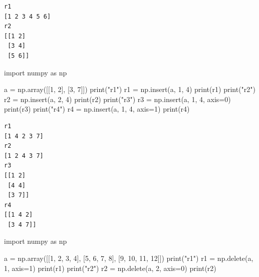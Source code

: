 \documentclass[
  english,
  letterpaper,
  DIV=11,
  numbers=noendperiod]{scrreprt}
\newenvironment{Shaded}{\begin{snugshade}}{\end{snugshade}}
\newcommand{\BuiltInTok}[1]{\textcolor[rgb]{0.00,0.23,0.31}{#1}}
\newcommand{\DecValTok}[1]{\textcolor[rgb]{0.68,0.00,0.00}{#1}}
\newcommand{\ImportTok}[1]{\textcolor[rgb]{0.00,0.46,0.62}{#1}}
\newcommand{\NormalTok}[1]{\textcolor[rgb]{0.00,0.23,0.31}{#1}}
\newcommand{\OperatorTok}[1]{\textcolor[rgb]{0.37,0.37,0.37}{#1}}
\newcommand{\StringTok}[1]{\textcolor[rgb]{0.13,0.47,0.30}{#1}}
\begin{document}
\begin{verbatim}
r1
[1 2 3 4 5 6]
r2
[[1 2]
 [3 4]
 [5 6]]
\end{verbatim}

\begin{Shaded}
\begin{Highlighting}[]
\ImportTok{import}\NormalTok{ numpy }\ImportTok{as}\NormalTok{ np}

\NormalTok{a }\OperatorTok{=}\NormalTok{ np.array([[}\DecValTok{1}\NormalTok{, }\DecValTok{2}\NormalTok{], [}\DecValTok{3}\NormalTok{, }\DecValTok{7}\NormalTok{]])}
\BuiltInTok{print}\NormalTok{(}\StringTok{"r1"}\NormalTok{)}
\NormalTok{r1 }\OperatorTok{=}\NormalTok{ np.insert(a, }\DecValTok{1}\NormalTok{, }\DecValTok{4}\NormalTok{)}
\BuiltInTok{print}\NormalTok{(r1)}
\BuiltInTok{print}\NormalTok{(}\StringTok{"r2"}\NormalTok{)}
\NormalTok{r2 }\OperatorTok{=}\NormalTok{ np.insert(a, }\DecValTok{2}\NormalTok{, }\DecValTok{4}\NormalTok{)}
\BuiltInTok{print}\NormalTok{(r2)}
\BuiltInTok{print}\NormalTok{(}\StringTok{"r3"}\NormalTok{)}
\NormalTok{r3 }\OperatorTok{=}\NormalTok{ np.insert(a, }\DecValTok{1}\NormalTok{, }\DecValTok{4}\NormalTok{, axis}\OperatorTok{=}\DecValTok{0}\NormalTok{)}
\BuiltInTok{print}\NormalTok{(r3)}
\BuiltInTok{print}\NormalTok{(}\StringTok{"r4"}\NormalTok{)}
\NormalTok{r4 }\OperatorTok{=}\NormalTok{ np.insert(a, }\DecValTok{1}\NormalTok{, }\DecValTok{4}\NormalTok{, axis}\OperatorTok{=}\DecValTok{1}\NormalTok{)}
\BuiltInTok{print}\NormalTok{(r4)}
\end{Highlighting}
\end{Shaded}

\begin{verbatim}
r1
[1 4 2 3 7]
r2
[1 2 4 3 7]
r3
[[1 2]
 [4 4]
 [3 7]]
r4
[[1 4 2]
 [3 4 7]]
\end{verbatim}

\begin{Shaded}
\begin{Highlighting}[]
\ImportTok{import}\NormalTok{ numpy }\ImportTok{as}\NormalTok{ np}

\NormalTok{a }\OperatorTok{=}\NormalTok{ np.array([[}\DecValTok{1}\NormalTok{, }\DecValTok{2}\NormalTok{, }\DecValTok{3}\NormalTok{, }\DecValTok{4}\NormalTok{], [}\DecValTok{5}\NormalTok{, }\DecValTok{6}\NormalTok{, }\DecValTok{7}\NormalTok{, }\DecValTok{8}\NormalTok{], [}\DecValTok{9}\NormalTok{, }\DecValTok{10}\NormalTok{, }\DecValTok{11}\NormalTok{, }\DecValTok{12}\NormalTok{]])}
\BuiltInTok{print}\NormalTok{(}\StringTok{"r1"}\NormalTok{)}
\NormalTok{r1 }\OperatorTok{=}\NormalTok{ np.delete(a, }\DecValTok{1}\NormalTok{, axis}\OperatorTok{=}\DecValTok{1}\NormalTok{)}
\BuiltInTok{print}\NormalTok{(r1)}
\BuiltInTok{print}\NormalTok{(}\StringTok{"r2"}\NormalTok{)}
\NormalTok{r2 }\OperatorTok{=}\NormalTok{ np.delete(a, }\DecValTok{2}\NormalTok{, axis}\OperatorTok{=}\DecValTok{0}\NormalTok{)}
\BuiltInTok{print}\NormalTok{(r2)}
\end{Highlighting}
\end{Shaded}
\end{document}
